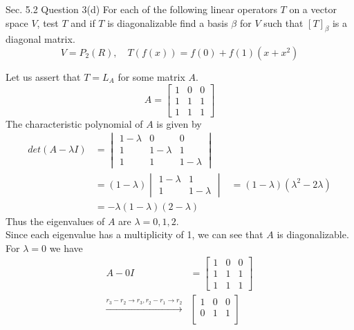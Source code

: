 \documentclass[answers,12pt,addpoints]{exam}
\begin{document}
\begin{questions}
    \question[10] Sec. 5.2 Question 3(d)
    For each of the following linear operators $T$ on a vector space $V$, test $T$ and if $T$ is diagonalizable find a basis $\beta$ for $V$ such that $[T]_{\beta}$ is a diagonal matrix.
    $$ V = P_2(R), \quad T(f(x)) = f(0) + f(1)(x+x^2)$$
    \begin{solution}
        Let us assert that $T = L_A$ for some matrix $A$.\\
        $$A = \begin{bmatrix}
            1 & 0 & 0\\
            1 & 1 & 1\\
            1 & 1 & 1
        \end{bmatrix}$$
        The characteristic polynomial of $A$ is given by
        \begin{align*}
            det(A - \lambda I) &= \begin{vmatrix}
                1 - \lambda & 0 & 0\\
                1 & 1 - \lambda & 1\\
                1 & 1 & 1 - \lambda
            \end{vmatrix}\\
            &= (1 - \lambda)\begin{vmatrix}
                1 - \lambda & 1\\
                1 & 1 - \lambda
            \end{vmatrix}
            &= (1 - \lambda)(\lambda^2 - 2\lambda)\\
            &= -\lambda(1 - \lambda)(2 - \lambda)
        \end{align*}
        Thus the eigenvalues of $A$ are $\lambda = 0, 1, 2$.\\
        Since each eigenvalue has a multiplicity of 1, we can see that $A$ is diagonalizable.\\
        For $\lambda = 0$ we have
        \begin{align*}
            A - 0I &= \begin{bmatrix}
                1 & 0 & 0\\
                1 & 1 & 1\\
                1 & 1 & 1
            \end{bmatrix} \\
            \xrightarrow{r_3 - r_2 \to r_3, r_2 - r_1 \to r_2} &\begin{bmatrix}
                1 & 0 & 0\\
                0 & 1 & 1\\

\end{bmatrix}
\end{align*}
\end{solution}
\end{questions}
\end{document}
